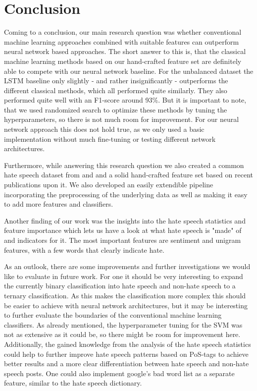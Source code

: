 \section{Conclusion} \label{conclusion}

Coming to a conclusion, our main research question was whether conventional machine learning approaches combined with suitable features can outperform neural network based approaches. The short answer to this is, that the classical machine learning methods based on our hand-crafted feature set are definitely able to compete with our neural network baseline. For the unbalanced dataset the LSTM baseline only slightly - and rather insignificantly - outperforms the different classical methods, which all performed quite similarly. They also performed quite well with an F1-score around 93\%. But it is important to note, that we used randomized search to optimize these methods by tuning the hyperparameters, so there is not much room for improvement. For our neural network approach this does not hold true, as we only used a basic implementation without much fine-tuning or testing different network architectures.

Furthermore, while answering this research question we also created a common hate speech dataset from \cite{ThomasDavidson2020} and \cite{DeGibert2020} and a solid hand-crafted feature set based on recent publications upon it. We also developed an easily extendible pipeline incorporating the preprocessing of the underlying data as well as making it easy to add more features and classifiers.

Another finding of our work was the insights into the hate speech statistics and feature importance which lets us have a look at what hate speech is "made" of and indicators for it. The most important features are sentiment and unigram features, with a few words that clearly indicate hate.

\vspace{0.5cm}

As an outlook, there are some improvements and further investigations we would like to evaluate in future work. For one it should be very interesting to expand the currently binary classification into hate speech and non-hate speech to a ternary classification. As this makes the classification more complex this should be easier to achieve with neural network architectures, but it may be interesting to further evaluate the boundaries of the conventional machine learning classifiers.
As already mentioned, the hyperparameter tuning for the SVM was not as extensive as it could be, so there might be room for improvement here. Additionally, the gained knowledge from the analysis of the hate speech statistics could help to further improve hate speech patterns based on PoS-tags to achieve better results and a more clear differentiation between hate speech and non-hate speech posts. One could also implement google's bad word list as a separate feature, similar to the hate speech dictionary.
